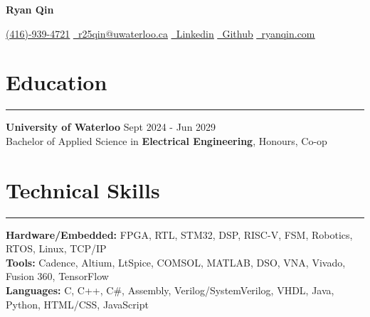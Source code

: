 \documentclass[10pt]{article}
\newcommand{\secsep}{0.5em}
\newcommand{\SSsep}{-2.0em}
\newcommand{\LtLsep}{0.5em}
\newcommand{\MHtLsep}{-0.7em}
\newcommand{\LtHsep}{0.9em}
\newcommand{\tabOffSet}{1.0em}
\begin{document}
 

\begin{center} 
    {\LARGE \textbf{Ryan Qin}} \\[0.7em]

    \newcommand{\linksep}{0.2em}

    \href{tel:+14169394721}{\uline{\faPhone (416)-939-4721}}
    \hspace{\linksep}\textbar\hspace{\linksep}
    \href{r25qin@uwaterloo.ca}{\uline{\faEnvelope \ r25qin@uwaterloo.ca}}
    \hspace{\linksep}\textbar\hspace{\linksep}
    \href{https://www.linkedin.com/in/ryan-qin-ece/}{\uline{\faLinkedin \ Linkedin}}
    \hspace{\linksep}\textbar\hspace{\linksep}
    \href{https://linkedin.com/in/yourusername}{\uline{\faGithub \ Github}}
    \hspace{\linksep}\textbar\hspace{\linksep}
    \href{https://www.ryanqin.com/}{\uline{\faLink \ ryanqin.com}}
    \\[\secsep]
\end{center} 

\section*{\large {Education}} \vspace{\MHtLsep} \hrule 
\vspace{\LtHsep}
\textbf{University of Waterloo} \hfill Sept 2024 - Jun 2029 \\[\LtLsep]
Bachelor of Applied Science in \textbf{Electrical Engineering}, Honours, Co-op
\\[\SSsep]

\section*{\large {Technical Skills}} \vspace{\MHtLsep} \hrule 
\vspace{\LtHsep}

\hspace*{\tabOffSet}\textbf{Hardware/Embedded:}  FPGA, RTL, STM32, DSP, RISC-V, FSM, Robotics, RTOS, Linux, TCP/IP  \\[\LtLsep]
\hspace*{\tabOffSet}\textbf{Tools:} Cadence, Altium, LtSpice, COMSOL, MATLAB, DSO, VNA, Vivado, Fusion 360, TensorFlow \\[\LtLsep]
\hspace*{\tabOffSet}\textbf{Languages:} C, C++, C\#, Assembly, Verilog/SystemVerilog, VHDL, Java, Python, HTML/CSS, JavaScript 
\\[\SSsep]
\end{document}
